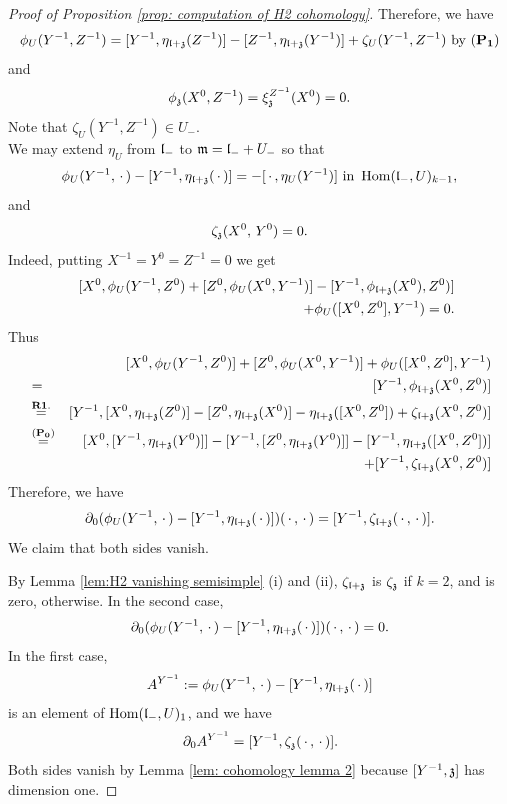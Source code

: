 \documentclass[12pt]{amsart}
\theoremstyle{plain}
\theoremstyle{definition}
\def\Hom{\operatorname{Hom}}
\begin{document}
\begin{proof} [Proof of Proposition \ref{prop: computation of H2 cohomology}]
   Therefore, we have
   $$\phi_U(Y^{-1}, Z^{-1}) =[Y^{-1}, \eta_{\frak l+ \frak z}(Z^{-1})] - [Z^{-1}, \eta_{\frak l + \frak z}(Y^{-1})]+\zeta_U(Y^{-1}, Z^{-1}) \text{ by } {\rm(}{\bf P_1}{\rm)} $$
   and
   $$\phi_{\frak z}(X^0, Z^{-1}) = \xi_{\frak z}^{Z^{-1}}(X^0) = 0.$$
 Note that $\zeta_U(Y^{-1}, Z^{-1}) \in U_-$.\\

%
    We may extend $\eta_U$ from $\frak l_-$ to $\frak m=\frak l_- + U_-$ so that   %
  $$\phi_U(Y^{-1},\,\cdot\,) - [Y^{-1}, \eta_{\frak l+ \frak z}(\,\cdot\,)] =-[\,\cdot\,, \eta_U(Y^{-1})] \text{ in } \Hom(\frak l_-, U)_{k-1}, $$
   and $$\zeta_{\frak z} (X^0,\,Y^0)=0.$$
  Indeed, putting $X^{-1}=Y^0=Z^{-1}=0$ we get
   \begin{eqnarray*}
   &&[X^0, \phi_U(Y^{-1}, Z^0) + [Z^0, \phi_U(X^0, Y^{-1})] -[Y^{-1}, \phi_{\frak l+ \frak z}(X^0), Z^0)] \\
   && + \phi_U([X^0, Z^0], Y^{-1}) =0.
   \end{eqnarray*}
   Thus
   \begin{eqnarray*}
   &&[X^0, \phi_U(Y^{-1},Z^0)] + [Z^0, \phi_U(X^0, Y^{-1})] + \phi_U([X^0, Z^0],Y^{-1}) \\
   &=& [Y^{-1}, \phi_{\frak l + \frak z}(X^0, Z^0)] \\
   &\stackrel{\bf R1.}{=}&[Y^{-1}, [X^0, \eta_{\frak l + \frak z}(Z^0)] - [Z^0, \eta_{\frak l + \frak z}(X^0)]-\eta_{\frak l+ \frak z}([X^0, Z^0]) + \zeta_{\frak l+ \frak z}(X^0, Z^0) ] \\
   &\stackrel{({\bf P_0})}{=}& [X^0, [Y^{-1}, \eta_{\frak l + \frak z}(Y^{0})]] - [Y^{-1}, [Z^0, \eta_{\frak l + \frak z}(Y^0)]] -[Y^{-1}, \eta_{\frak l + \frak z}([X^0, Z^0])] \\
   && + [Y^{-1}, \zeta_{\frak l+ \frak z}(X^0, Z^0)  ]
   \end{eqnarray*}
   Therefore, we have
   \begin{eqnarray*}
   \partial_0(\phi_U(Y^{-1},\,\cdot\,) -[Y^{-1}, \eta_{\frak l + \frak z}(\,\cdot\,)] ) (\,\cdot\,,\,\cdot\,) =[Y^{-1}, \zeta_{\frak l+ \frak z}(\,\cdot\,,\,\cdot\,)] .
   \end{eqnarray*}
    We claim that both  sides vanish.


   By Lemma \ref{lem:H2 vanishing semisimple} (i) and (ii),   $\zeta_{\frak l+ \frak z}$  is $\zeta_{\frak z} $ if $k=2$, and is zero, otherwise.
   In the second case,
   $$\partial_0(\phi_U(Y^{-1},\,\cdot\,) -[Y^{-1}, \eta_{\frak l + \frak z}(\,\cdot\,)] ) (\,\cdot\,,\,\cdot\,) = 0.$$
    In the first case,  $$A^{Y^{-1}}:=\phi_U(Y^{-1},\,\cdot\,) -[Y^{-1}, \eta_{\frak l + \frak z}(\,\cdot\,)] $$ is an element of $\Hom(\frak l_-, U)_1$, and
   we have
    \begin{eqnarray*}
   \partial_0 A^{Y^{-1}} =[Y^{-1}, \zeta_{\frak z}(\,\cdot\,,\,\cdot\,)].
   \end{eqnarray*}
   Both sides vanish by Lemma \ref{lem: cohomology lemma 2} because $[Y^{-1},\frak z]$ has dimension one.


\end{proof}
\end{document}
